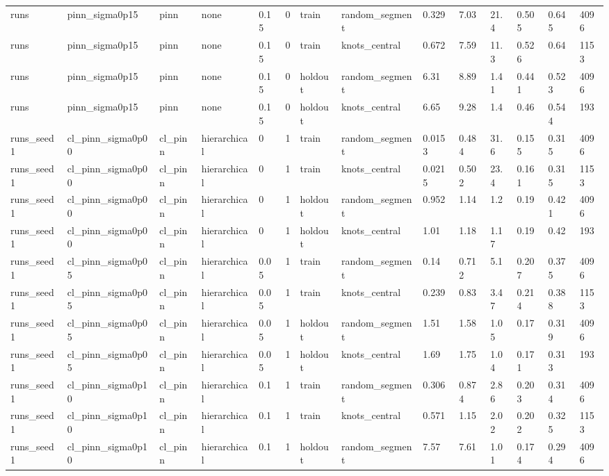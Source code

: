 \begin{table}[t]
\begin{tabular}{llllllllllllll}
runs & pinn\_sigma0p15 & pinn & none & 0.15 & 0 & train & random\_segment & 0.329 & 7.03 & 21.4 & 0.505 & 0.645 & 4096 \\
runs & pinn\_sigma0p15 & pinn & none & 0.15 & 0 & train & knots\_central & 0.672 & 7.59 & 11.3 & 0.526 & 0.64 & 1153 \\
runs & pinn\_sigma0p15 & pinn & none & 0.15 & 0 & holdout & random\_segment & 6.31 & 8.89 & 1.41 & 0.441 & 0.523 & 4096 \\
runs & pinn\_sigma0p15 & pinn & none & 0.15 & 0 & holdout & knots\_central & 6.65 & 9.28 & 1.4 & 0.46 & 0.544 & 193 \\
runs\_seed1 & cl\_pinn\_sigma0p00 & cl\_pinn & hierarchical & 0 & 1 & train & random\_segment & 0.0153 & 0.484 & 31.6 & 0.155 & 0.315 & 4096 \\
runs\_seed1 & cl\_pinn\_sigma0p00 & cl\_pinn & hierarchical & 0 & 1 & train & knots\_central & 0.0215 & 0.502 & 23.4 & 0.161 & 0.315 & 1153 \\
runs\_seed1 & cl\_pinn\_sigma0p00 & cl\_pinn & hierarchical & 0 & 1 & holdout & random\_segment & 0.952 & 1.14 & 1.2 & 0.19 & 0.421 & 4096 \\
runs\_seed1 & cl\_pinn\_sigma0p00 & cl\_pinn & hierarchical & 0 & 1 & holdout & knots\_central & 1.01 & 1.18 & 1.17 & 0.19 & 0.42 & 193 \\
runs\_seed1 & cl\_pinn\_sigma0p05 & cl\_pinn & hierarchical & 0.05 & 1 & train & random\_segment & 0.14 & 0.712 & 5.1 & 0.207 & 0.375 & 4096 \\
runs\_seed1 & cl\_pinn\_sigma0p05 & cl\_pinn & hierarchical & 0.05 & 1 & train & knots\_central & 0.239 & 0.83 & 3.47 & 0.214 & 0.388 & 1153 \\
runs\_seed1 & cl\_pinn\_sigma0p05 & cl\_pinn & hierarchical & 0.05 & 1 & holdout & random\_segment & 1.51 & 1.58 & 1.05 & 0.17 & 0.319 & 4096 \\
runs\_seed1 & cl\_pinn\_sigma0p05 & cl\_pinn & hierarchical & 0.05 & 1 & holdout & knots\_central & 1.69 & 1.75 & 1.04 & 0.171 & 0.313 & 193 \\
runs\_seed1 & cl\_pinn\_sigma0p10 & cl\_pinn & hierarchical & 0.1 & 1 & train & random\_segment & 0.306 & 0.874 & 2.86 & 0.203 & 0.314 & 4096 \\
runs\_seed1 & cl\_pinn\_sigma0p10 & cl\_pinn & hierarchical & 0.1 & 1 & train & knots\_central & 0.571 & 1.15 & 2.02 & 0.202 & 0.325 & 1153 \\
runs\_seed1 & cl\_pinn\_sigma0p10 & cl\_pinn & hierarchical & 0.1 & 1 & holdout & random\_segment & 7.57 & 7.61 & 1.01 & 0.174 & 0.294 & 4096 \\

\end{tabular}
\end{table}
